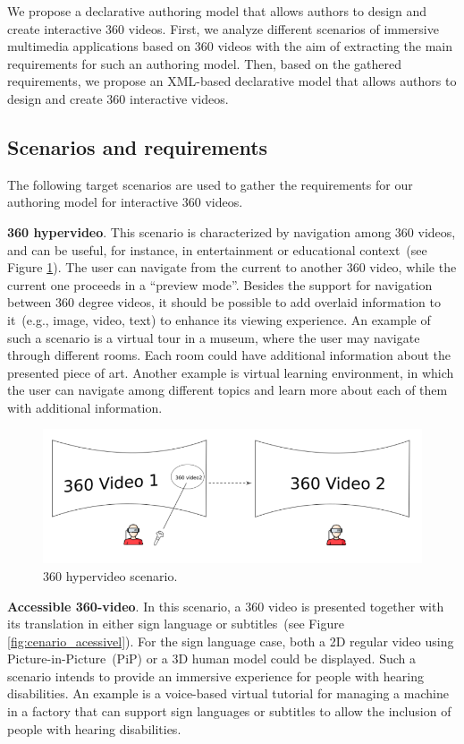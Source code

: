 We propose a declarative authoring model that allows authors to design and create interactive 360 videos.
First, we analyze different scenarios of immersive multimedia applications
based on 360 videos with the aim of extracting the main requirements for such
an authoring model.
Then, based on the gathered requirements, we propose an XML-based declarative
model that allows authors to design and create 360 interactive videos.

\subsection{Scenarios and requirements}
\label{subsec:authoring_scenarios}

The following target scenarios are used to gather the requirements for our
authoring model for interactive 360 videos.

\textbf{360 hypervideo}.
This scenario is characterized by navigation among 360 videos, and can be useful, for instance, in entertainment or educational context~(see Figure \ref{fig:cenario_hiper}).
The user can navigate from the current to another 360 video, while the current
one proceeds in a ``preview mode''.
Besides the support for navigation between 360 degree videos, it should be
possible to add overlaid information to it~(e.g., image, video, text) to
enhance its viewing experience.
An example of such a scenario is a virtual tour in a museum, where the user
may navigate through different rooms.
Each room could have additional information about the presented piece of art.
Another example is virtual learning environment, in which the user can navigate among different topics and learn more about each of them with additional information.

\begin{figure}[!ht]
    \centering
    \includegraphics[width=0.8\linewidth]{img/video360/hyper.png}
    \caption{360 hypervideo scenario.}
    \label{fig:cenario_hiper}
\end{figure}

\textbf{Accessible 360-video}. 
In this scenario, a 360 video is presented together with its translation in either sign language or subtitles~(see Figure \ref{fig:cenario_acessivel}).
For the sign language case, both a 2D regular video using Picture-in-Picture~(PiP) or a 3D human model could be displayed.
Such a scenario intends to provide an immersive experience for people with hearing disabilities.
An example is a voice-based virtual tutorial for managing a machine in a factory that can support sign languages or subtitles to allow the inclusion of people with hearing disabilities.

